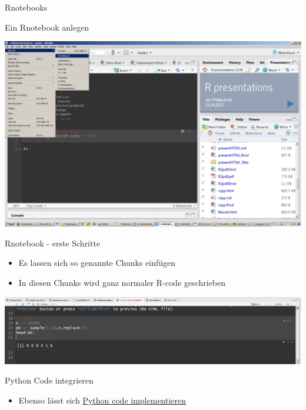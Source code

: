 \documentclass[ignorenonframetext,]{beamer}
\providecommand{\tightlist}{%
\setlength{\itemsep}{0pt}\setlength{\parskip}{0pt}}
\begin{document}
\begin{frame}[fragile]{Rnotebooks}

\begin{block}{Ein Rnotebook anlegen}

\includegraphics{./tex2pdf.9796/d34154692b30ba477e047d6d21521a664633debc.png}

\end{block}

\begin{block}{Rnotebook - erste Schritte}

\begin{itemize}
\tightlist
\item
  Es lassen sich so genannte Chunks einfügen
\item
  In diesen Chunks wird ganz normaler R-code geschrieben
\end{itemize}

\includegraphics{./tex2pdf.9796/973493b0437dbf133e9907d00ce10ce2f82855fb.png}

\end{block}

\begin{block}{Python Code integrieren}

\begin{itemize}
\tightlist
\item
  Ebenso lässt sich
  \href{https://support.rstudio.com/hc/en-us/articles/233066128-Do-Notebooks-support-other-languages-}{Python
  code implementieren}
\end{itemize}


\end{block}
\end{frame}
\end{document}
